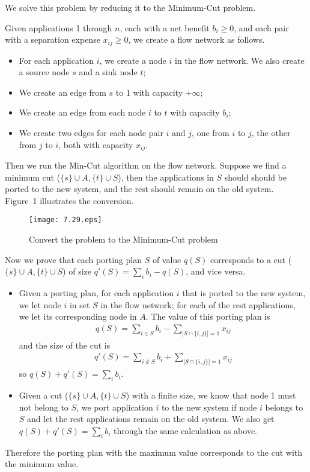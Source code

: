 \documentclass[12pt,letterpaper]{article}
\begin{document}
We solve this problem by reducing it to the Minimum-Cut problem.

Given applications 1 through $n$, each with a net benefit $b_i \ge 0$, and each pair with a separation expense $x_{ij} \ge 0$, we create a flow network as follows.
\begin{itemize}
\item For each application $i$, we create a node $i$ in the flow network. We also create a source node $s$ and a sink node $t$;
\item We create an edge from $s$ to 1 with capacity $+\infty$;
\item We create an edge from each node $i$ to $t$ with capacity $b_i$;
\item We create two edges for each node pair $i$ and $j$, one from $i$ to $j$, the other from $j$ to $i$, both with capacity $x_{ij}$.
\end{itemize}

Then we run the Min-Cut algorithm on the flow network. Suppose we find a minimum cut ($\{s\}\cup A, \{t\}\cup S$), then the applications in $S$ should should be ported to the new system, and the rest should remain on the old system. Figure~1 illustrates the conversion.
\begin{figure}
\begin{center}
\texttt{[image: 7.29.eps]}
\caption{Convert the problem to the Minimum-Cut problem}
\end{center}
\end{figure}

Now we prove that each porting plan $S$ of value $q(S)$ corresponds to a cut ($\{s\}\cup A, \{t\}\cup S$) of size $q'(S)=\sum_i b_i-q(S)$, and vice versa.
\begin{itemize}
\item Given a porting plan, for each application $i$ that is ported to the new system, we let node $i$ in set $S$ in the flow network; for each of the rest applications, we let its corresponding node in $A$. The value of this porting plan is 
\begin{align}
q(S)=\sum_{i\in S}b_i-\sum_{|S\cap \{i,j\}|=1}x_{ij}
\end{align}
and the size of the cut is 
\begin{align}
q'(S)=\sum_{i\notin S}b_i+\sum_{|S\cap \{i,j\}|=1}x_{ij}
\end{align}
so $q(S)+q'(S)=\sum_i b_i$.
\item Given a cut ($\{s\}\cup A, \{t\}\cup S$) with a finite size, we know that node 1 must not belong to $S$, we port application $i$ to the new system if node $i$ belongs to $S$ and let the rest applications remain on the old system. We also get $q(S)+q'(S)=\sum_i b_i$ through the same calculation as above.
\end{itemize}
Therefore the porting plan with the maximum value corresponds to the cut with the minimum value.
\end{document}
